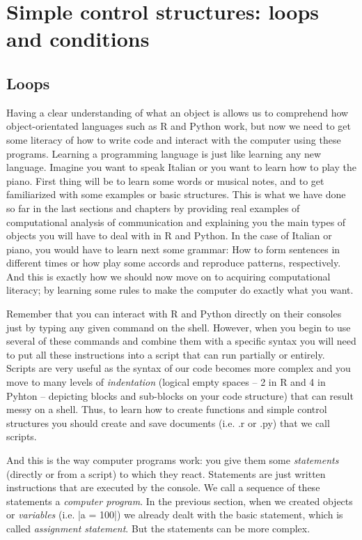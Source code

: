 \section{Simple control structures: loops and conditions}	
\label{sec:controlstructures}

\subsection{Loops}
Having a clear understanding of what an object is allows us to
comprehend how object-orientated languages such as R and Python work,
but now we need to get some literacy of how to write code and interact
with the computer using these programs. Learning a programming
language is just like learning any new language.  Imagine you want to
speak Italian or you want to learn how to play the piano. First thing
will be to learn some words or musical notes, and to get familiarized
with some examples or basic structures. This is what we have done so
far in the last sections and chapters by providing real examples of
computational analysis of communication and explaining you the main
types of objects you will have to deal with in R and Python. In the
case of Italian or piano, you would have to learn next some grammar:
How to form sentences in different times or how play some accords and
reproduce patterns, respectively. And this is exactly how we should
now move on to acquiring computational literacy; by learning some
rules to make the computer do exactly what you want.

Remember that you can interact with R and Python directly on their
consoles just by typing any given command on the shell. However, when
you begin to use several of these commands and combine them with a
specific syntax you will need to put all these instructions into a
script that can run partially or entirely. Scripts are very useful as
the syntax of our code becomes more complex and you move to many
levels of \emph{indentation} (logical empty spaces -- 2 in R and 4 in
Pyhton -- depicting blocks and sub-blocks on your code structure) that
can result messy on a shell. Thus, to learn how to create functions
and simple control structures you should create and save documents
(i.e. .r or .py) that we call scripts.

And this is the way computer programs work: you give them some
\emph{statements} (directly or from a script) to which they
react. Statements are just written instructions that are executed by
the console.  We call a sequence of these statements a \emph{computer
  program}. In the previous section, when we created objects or
\emph{variables} (i.e. |a = 100|) we already dealt
with the basic statement, which is called \emph{assignment
  statement}. But the statements can be more complex.

